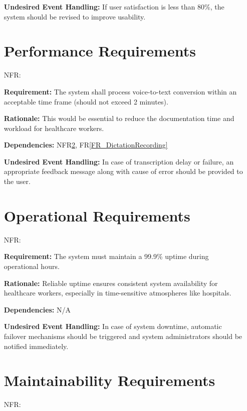 \documentclass[12pt]{article}
\newcounter{nfrnum} %
\begin{document}
\begin{itemize}
\textbf{Undesired Event Handling:} If user satisfaction is less than 80\%, the system should be revised to improve usability.

\section{Performance Requirements}

\item[NFR\refstepcounter{nfrnum}\thenfrnum \label{NFR_Performance}:]

\textbf{Requirement:} The system shall process voice-to-text conversion within an acceptable time frame (should not exceed 2 minutes).

\textbf{Rationale:} This would be essential to reduce the documentation time and workload for healthcare workers.

\textbf{Dependencies:} NFR\ref{NFR_Operational}, FR\ref{FR_DictationRecording}

\textbf{Undesired Event Handling:} In case of transcription delay or failure, an appropriate feedback message along with cause of error should be provided to the user.

\section{Operational Requirements} \label{NFR_Operational}

\item[NFR\refstepcounter{nfrnum}\thenfrnum \label{NFR_Operational}:]

\textbf{Requirement:} The system must maintain a 99.9\% uptime during operational hours.

\textbf{Rationale:} Reliable uptime ensures consistent system availability for healthcare workers, especially in time-sensitive atmospheres like hospitals.

\textbf{Dependencies:} N/A

\textbf{Undesired Event Handling:} In case of system downtime, automatic failover mechanisms should be triggered and system administrators should be notified immediately.

\section{Maintainability Requirements}

\item[NFR\refstepcounter{nfrnum}\thenfrnum \label{NFR_Maintainability}:]


\end{itemize}
\end{document}
